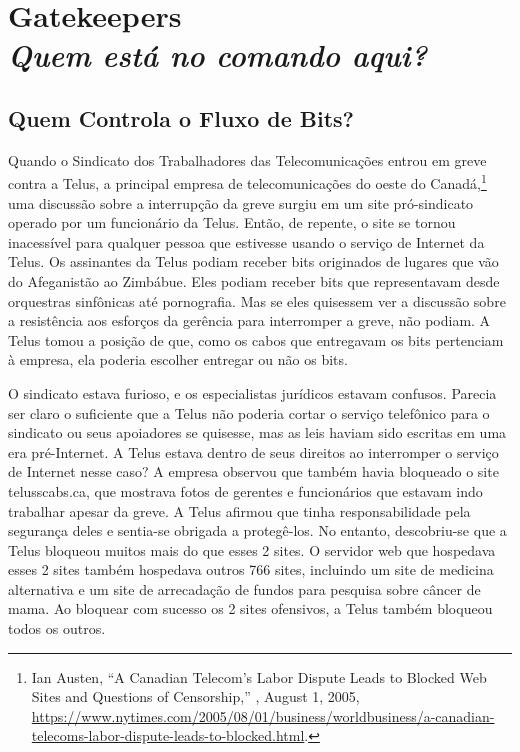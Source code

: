 \chapter[Gatekeepers]{Gatekeepers\\\large\textit{Quem está no comando aqui?}}
\label{gatekeepers}

\section{Quem Controla o Fluxo de Bits?}
\label{gatekeepers:fluxo-bits}

Quando o Sindicato dos Trabalhadores das Telecomunicações entrou em greve contra
a Telus, a principal empresa de telecomunicações do oeste do Canadá,\footnote{Ian
Austen, ``A Canadian Telecom's Labor Dispute Leads to Blocked Web Sites and
Questions of Censorship,'' , August 1, 2005, \url{https://www.nytimes.com/2005/08/01/business/worldbusiness/a-canadian-telecoms-labor-dispute-leads-to-blocked.html}.}
uma discussão sobre a interrupção da greve surgiu em um site pró-sindicato operado
por um funcionário da Telus. Então, de repente, o site se tornou inacessível para
qualquer pessoa que estivesse usando o serviço de Internet da Telus. Os assinantes
da Telus podiam receber bits originados de lugares que vão do Afeganistão ao Zimbábue.
Eles podiam receber bits que representavam desde orquestras sinfônicas até pornografia.
Mas se eles quisessem ver a discussão sobre a resistência aos esforços da gerência
para interromper a greve, não podiam. A Telus tomou a posição de que, como os cabos
que entregavam os bits pertenciam à empresa, ela poderia escolher entregar ou não
os bits.

O sindicato estava furioso, e os especialistas jurídicos estavam confusos. Parecia
ser claro o suficiente que a Telus não poderia cortar o serviço telefônico para o
sindicato ou seus apoiadores se quisesse, mas as leis haviam sido escritas em uma
era pré-Internet. A Telus estava dentro de seus direitos ao interromper o serviço
de Internet nesse caso? A empresa observou que também havia bloqueado o site
telusscabs.ca, que mostrava fotos de gerentes e funcionários que estavam indo
trabalhar apesar da greve. A Telus afirmou que tinha responsabilidade pela segurança
deles e sentia-se obrigada a protegê-los. No entanto, descobriu-se que a Telus
bloqueou muitos mais do que esses 2 sites. O servidor web que hospedava esses 2
sites também hospedava outros 766 sites, incluindo um site de medicina alternativa
e um site de arrecadação de fundos para pesquisa sobre câncer de mama. Ao bloquear
com sucesso os 2 sites ofensivos, a Telus também bloqueou todos os outros.

